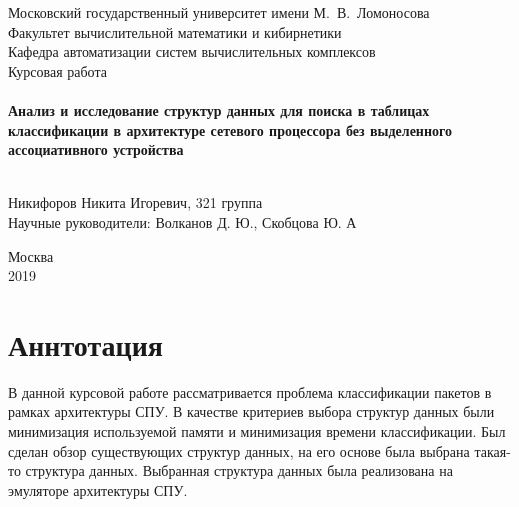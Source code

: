\documentclass[a4peper, 12pt, titlepage, finall]{report}
\begin{document}
    \begin{titlepage}
        \begin{center}
            {\small \sc Московский государственный университет имени М.~В.~Ломоносова\\
            Факультет вычислительной математики и кибирнетики\\
            Кафедра автоматизации систем вычислительных комплексов\\}
            \vfill
            {\large \sc Курсовая работа}\\~\\

            {\large \bf Анализ и исследование структур данных для поиска в таблицах классификации в архитектуре сетевого процессора без выделенного ассоциативного устройства}\\~\\

        \end{center}
        
        \begin{flushright}
            \vfill
            \vfill
            {Никифоров Никита Игоревич, 321 группа}\\
            {Научные руководители: Волканов Д. Ю., Скобцова Ю. А}
        \end{flushright}

        \begin{center}
            \vfill
            {\small Москва\\2019}
        \end{center}
    \end{titlepage}

    \chapter*{Аннтотация}
        В данной курсовой работе рассматривается проблема классификации пакетов в рамках архитектуры СПУ. В качестве критериев выбора структур данных были минимизация 
        используемой памяти и минимизация времени классификации. Был сделан обзор существующих структур данных, на его основе была выбрана {\ttfamily такая-то} 
        структура данных. Выбранная структура данных была реализована на эмуляторе архитектуры СПУ.
        
    \newpage
    \tableofcontents
    \newpage
\end{document}
